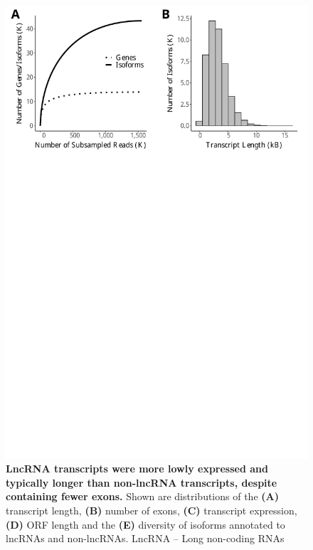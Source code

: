 \begin{figure}[htp]
	\begin{center}
		\includegraphics[page=7,trim={0 1cm 0 0},scale = 0.55]{Figures/IsoSeqWholeTranscriptome.pdf}
	\end{center}
	\captionsetup{width=0.95\textwidth}
	\caption[Characterisation of LncRNAs in the mouse cortex]%
	{\textbf{LncRNA transcripts were more lowly expressed and typically longer than non-lncRNA transcripts, despite containing fewer exons.} Shown are distributions of the \textbf{(A)} transcript length, \textbf{(B)} number of exons, \textbf{(C)} transcript expression, \textbf{(D)} ORF length and the \textbf{(E)} diversity of isoforms annotated to lncRNAs and non-lncRNAs. LncRNA – Long non-coding RNAs}
	\label{fig:isoseq_whole_lncRNA}
\end{figure}

